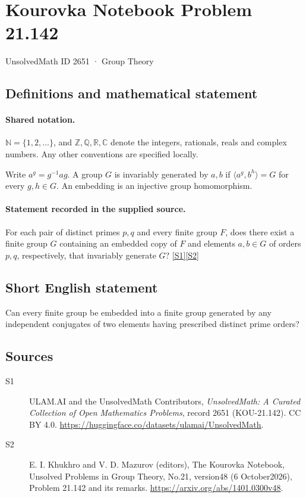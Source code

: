 \documentclass[11pt]{article}
\newcommand{\sref}[2]{\hyperlink{source:#1:#2}{[S#2]}}
\begin{document}
\setcounter{section}{2650}
\section{Kourovka Notebook Problem 21.142}\label{2651}
{\small\sffamily UnsolvedMath ID 2651 · Group Theory}
\subsection{Definitions and mathematical statement}

\paragraph{Shared notation.}$\mathbb N=\{1,2,\ldots\}$, and $\mathbb Z,\mathbb Q,\mathbb R,\mathbb C$ denote the integers, rationals, reals and complex numbers. Any other conventions are specified locally.


Write $a^g=g^{-1}ag$. A group $G$ is invariably generated by $a,b$ if $\langle a^g,b^h\rangle=G$ for every $g,h\in G$. An embedding is an injective group homomorphism.
\paragraph{Statement recorded in the supplied source.}
For each pair of distinct primes $p,q$ and every finite group $F$, does there exist a finite group $G$ containing an embedded copy of $F$ and elements $a,b\in G$ of orders $p,q$, respectively, that invariably generate $G$? \sref{2651}{1}\sref{2651}{2}
\subsection{Short English statement}
Can every finite group be embedded into a finite group generated by any independent conjugates of two elements having prescribed distinct prime orders?
\subsection{Sources}
\begin{description}
\item[\hypertarget{source:2651:1}{S1}] ULAM.AI and the UnsolvedMath Contributors, \emph{UnsolvedMath: A Curated Collection of Open Mathematics Problems}, record 2651 (KOU-21.142). CC BY 4.0. \url{https://huggingface.co/datasets/ulamai/UnsolvedMath}.
\item[\hypertarget{source:2651:2}{S2}] E. I. Khukhro and V. D. Mazurov (editors), The Kourovka Notebook, Unsolved Problems in Group Theory, No.21, version48 (6 October2026), Problem 21.142 and its remarks. \url{https://arxiv.org/abs/1401.0300v48}.
\end{description}
\label{end:2651}
\end{document}
